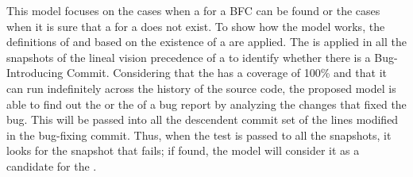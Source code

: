 \documentclass[a4paper, 12pt]{book}
\begin{document}
This model focuses on the cases when a \BIC for a BFC can be found or the cases when it is sure that a \BIC for a \BFC does not exist. To show how the model works, the definitions of \BIC and \BFC based on the existence of a \TSB are applied. The \TSB is applied in all the snapshots of the lineal vision precedence of a \BFC to identify whether there is a Bug-Introducing Commit. Considering that the \TSB  has a coverage of 100\% and that it can run indefinitely across the history of the source code, the proposed model is able to find out the \BIC or the \FFC of a bug report by analyzing the changes that fixed the bug. This \TSB will be passed into all the descendent commit set of the lines modified in the bug-fixing commit. Thus, when the \TSB test is passed to all the snapshots, it looks for the snapshot that fails; if found, the model will consider it as a candidate for the \BIC. %





\end{document}
